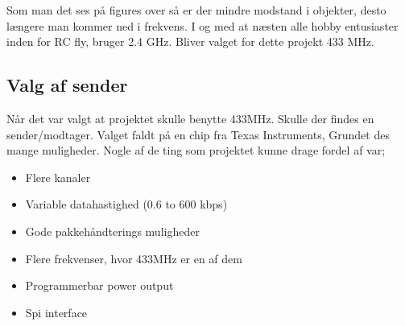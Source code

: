 \documentclass[Main]{subfiles}
\begin{document}
Som man det ses på figures over så er der mindre modstand i objekter, desto længere man kommer ned i frekvens.
I og med at næsten alle hobby entusiaster inden for RC fly, bruger 2.4 GHz. 
Bliver valget for dette projekt 433 MHz.

\subsection{Valg af sender}

Når det var valgt at projektet skulle benytte 433MHz. Skulle der findes en sender/modtager.
Valget faldt på en chip fra Texas Instruments, Grundet des mange muligheder.
Nogle af de ting som projektet kunne drage fordel af var;

\begin{itemize}
\item Flere kanaler
\item Variable datahastighed (0.6 to 600 kbps)
\item Gode pakkehåndterings muligheder 
\item Flere frekvenser, hvor 433MHz er en af dem
\item Programmerbar power output
\item Spi interface
\end{itemize}
\end{document}
